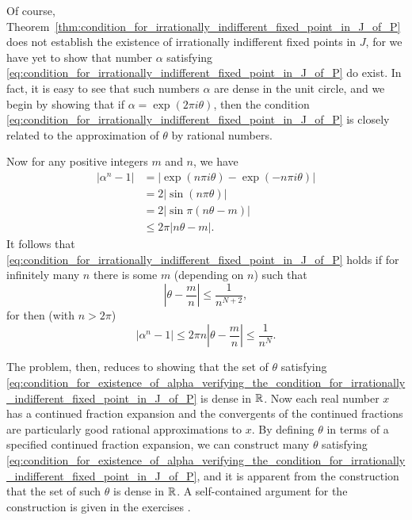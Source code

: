 \begin{remark}
    Of course,
    Theorem~\ref{thm:condition_for_irrationally_indifferent_fixed_point_in_J_of_P}
    does not establish the existence of irrationally indifferent fixed points in
    $J$, for we have yet to show that number $\alpha$ satisfying
    \eqref{eq:condition_for_irrationally_indifferent_fixed_point_in_J_of_P} do
    exist. In fact, it is easy to see that such numbers $\alpha$ are dense in the
    unit circle, and we begin by showing that if $\alpha = \exp(2\pi i \theta)$,
    then the condition
    \eqref{eq:condition_for_irrationally_indifferent_fixed_point_in_J_of_P} is
    closely related to the approximation of $\theta$ by rational numbers.

    Now for any positive integers $m$ and $n$, we have
    \begin{align*}
        |\alpha^n - 1| &= |\exp(n\pi i \theta) - \exp(-n\pi i \theta)| \\
                    &= 2|\sin(n\pi\theta)| \\
                    &= 2|\sin\pi(n\theta - m)| \\
                    &\leq 2\pi |n\theta - m|.
    \end{align*}
    It follows that
    \eqref{eq:condition_for_irrationally_indifferent_fixed_point_in_J_of_P}
    holds if for infinitely many $n$ there is some $m$ (depending on $n$) such
    that
    \begin{equation}
        \label{eq:condition_for_existence_of_alpha_verifying_the_condition_for_irrationally_indifferent_fixed_point_in_J_of_P}
        \left|\theta - \frac{m}{n}\right| \leq \frac{1}{n^{N+2}},
    \end{equation}
    for then (with $n > 2\pi$)
    \begin{equation*}
        |\alpha^n - 1| \leq 2\pi n \left|\theta - \frac{m}{n}\right| \leq \frac{1}{n^{N}}.
    \end{equation*}

    The problem, then, reduces to showing that the set of $\theta$ satisfying
    \eqref{eq:condition_for_existence_of_alpha_verifying_the_condition_for_irrationally_indifferent_fixed_point_in_J_of_P}
    is dense in $\mathbb{R}$. Now each real number $x$ has a continued fraction
    expansion and the convergents of the continued fractions are particularly
    good rational approximations to $x$. By defining $\theta$ in terms of a
    specified continued fraction expansion, we can construct many $\theta$
    satisfying
    \eqref{eq:condition_for_existence_of_alpha_verifying_the_condition_for_irrationally_indifferent_fixed_point_in_J_of_P},
    and it is apparent from the construction that the set of such $\theta$ is
    dense in $\mathbb{R}$. A self-contained argument for the construction is given in
    the exercises \cite{Beardon1991}.
\end{remark}


